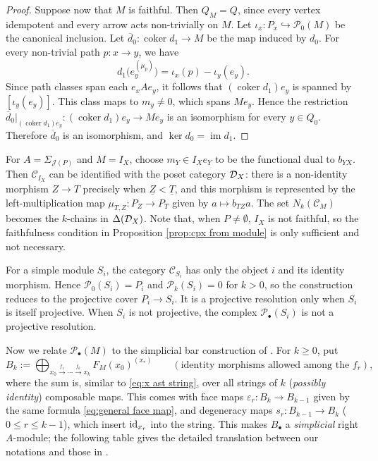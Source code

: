 \documentclass[a4paper,leqno]{amsart}
\begin{document}
\begin{proof}
Suppose now that $M$ is faithful. Then $Q_M=Q$, since every vertex idempotent and every arrow acts non-trivially on $M$. Let $\iota_x:P_x\hookrightarrow\mathcal P_0(M)$ be the canonical inclusion. Let $\overline{d}_0:\operatorname{coker}d_1\to M$ be the map induced by $d_0$. For every non-trivial path $p:x\to y$, we have
\[
d_1\bigl(e_y^{(\mu_p)}\bigr)
=\iota_x(p)-\iota_y(e_y).
\]
Since path classes span each $e_xAe_y$, it follows that $(\operatorname{coker}d_1)e_y$ is spanned by $[\iota_y(e_y)]$. This class maps to $m_y\neq0$, which spans $Me_y$. Hence the restriction $\overline{d}_0|_{(\operatorname{coker}d_1)e_y}:(\operatorname{coker}d_1)e_y\to Me_y$
is an isomorphism for every $y\in Q_0$. Therefore $\overline{d}_0$ is an isomorphism, and $\ker d_0=\operatorname{im}d_1$.
\end{proof}

\begin{eg}\label{eg:DX is C_IX}
For $A=\Sigma_{\mathcal J(P)}$ and $M=I_X$, choose $m_Y\in I_Xe_Y$ to be the functional dual to $b_{YX}$.  Then $\mathcal C_{I_X}$ can be identified with the poset category $\mathcal D_X$: there is a non-identity morphism $Z\to T$ precisely when $\underline{Z}<\underline{T}$, and this morphism is represented by the left-multiplication map $\mu_{T,Z}:P_Z\to P_T$ given by $a\mapsto b_{TZ}a$. The set $N_k(\mathcal{C}_M)$ becomes the $k$-chains in $\Delta(\mathcal D_X)$.
Note that, when $P\neq\emptyset$, $I_X$ is not faithful, so the faithfulness condition in Proposition \ref{prop:cpx from module} is only sufficient and not necessary.
\end{eg}

\begin{eg}\label{eg:non exact cpx from simple}
For a simple module $S_i$, the category $\mathcal C_{S_i}$ has only the object $i$ and its identity morphism. Hence $\mathcal P_0(S_i)=P_i$ and $\mathcal P_k(S_i)=0$ for $k>0$, so the construction reduces to the projective cover $P_i\to S_i$.  It is a projective resolution only when $S_i$ is itself projective. When $S_i$ is not projective, the complex $\mathcal P_\bullet(S_i)$ is not a projective resolution.
\end{eg}


Now we relate $\mathcal P_\bullet(M)$ to the simplicial bar construction of \cite[Definition~4.2.1]{Rie14}.  For $k\geq0$, put
\[
B_k:=\bigoplus_{x_0\xrightarrow{f_1}\cdots\xrightarrow{f_k}x_k}F_M(x_0)^{(x_\ast)}
 \qquad(\text{identity morphisms allowed among the }f_r),
\]
where the sum is, similar to \eqref{eq:x ast string}, over all strings of $k$ (\emph{possibly identity}) composable maps. 
This comes with face maps $\varepsilon_r\colon B_k\to B_{k-1}$ given by the same formula \eqref{eq:general face map}, and degeneracy maps $s_r\colon B_{k-1}\to B_k$ ($0\leq r\leq k-1$), which insert $\operatorname{id}_{x_r}$ into the string. 
This makes $B_\bullet$ a \emph{simplicial} right $A$-module; the following table gives the detailed translation between our notations and those in \cite{Rie14}.
\end{document}
